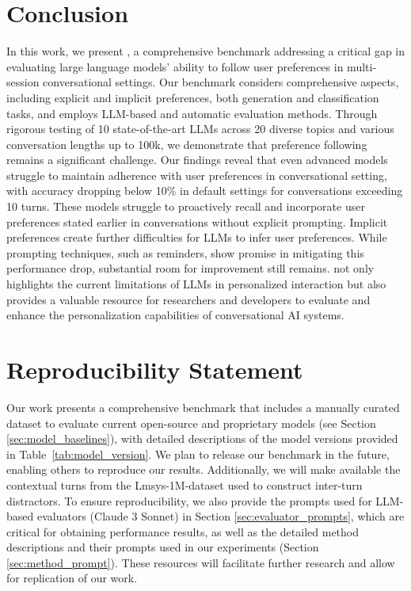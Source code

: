 \vspace{-0.8em} 
\section{Conclusion}
In this work, we present \ours, a comprehensive benchmark addressing a critical gap in evaluating large language models' ability to follow user preferences in multi-session conversational settings. Our benchmark considers comprehensive aspects, including explicit and implicit preferences, both generation and classification tasks, and employs LLM-based and automatic evaluation methods. Through rigorous testing of 10 state-of-the-art LLMs across 20 diverse topics and various conversation lengths up to 100k, we demonstrate that preference following remains a significant challenge. Our findings reveal that even advanced models struggle to maintain adherence with user preferences in conversational setting, with accuracy dropping below 10\% in default settings for conversations exceeding 10 turns. These models struggle to proactively recall and incorporate user preferences stated earlier in conversations without explicit prompting. Implicit preferences create further difficulties for LLMs to infer user preferences. While prompting techniques, such as reminders, show promise in mitigating this performance drop, substantial room for improvement still remains. \ours{} not only highlights the current limitations of LLMs in personalized interaction but also provides a valuable resource for researchers and developers to evaluate and enhance the personalization capabilities of conversational AI systems.

\newpage
\section{Reproducibility Statement}

Our work presents a comprehensive benchmark that includes a manually curated dataset to evaluate current open-source and proprietary models (see Section \ref{sec:model_baselines}), with detailed descriptions of the model versions provided in Table~\ref{tab:model_version}. We plan to release our benchmark in the future, enabling others to reproduce our results. Additionally, we will make available the contextual turns from the Lmsys-1M-dataset used to construct inter-turn distractors. To ensure reproducibility, we also provide the prompts used for LLM-based evaluators (Claude 3 Sonnet) in Section \ref{sec:evaluator_prompts}, which are critical for obtaining performance results, as well as the detailed method descriptions and their prompts used in our experiments (Section \ref{sec:method_prompt}). These resources will facilitate further research and allow for replication of our work.

